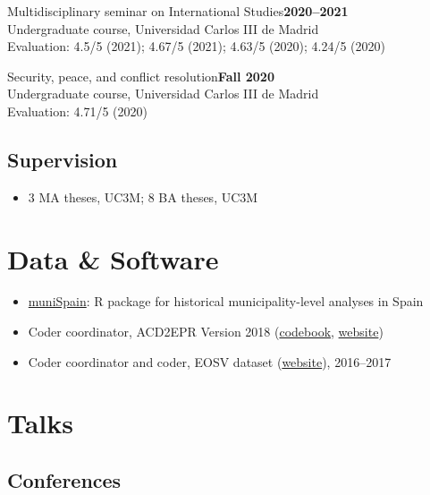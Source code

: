 \documentclass[a4paper, 12pt]{article}
\begin{document}
\noindent
Multidisciplinary seminar on International Studies\hfill\textbf{2020--2021}\\
{\small Undergraduate course, Universidad Carlos III de Madrid}\\
{\small Evaluation: 4.5/5 (2021); 4.67/5 (2021); 4.63/5 (2020); 4.24/5 (2020)}
\vspace{10pt}

\noindent
Security, peace, and conflict resolution\hfill\textbf{Fall 2020}\\
{\small Undergraduate course, Universidad Carlos III de Madrid}\\
{\small Evaluation: 4.71/5 (2020)}

\vspace{-10pt}
\subsection*{Supervision}

\begin{itemize}[leftmargin=*, nolistsep]
  \item 3 MA theses, UC3M; 8 BA theses, UC3M
\end{itemize}

\section*{Data \& Software}

\begin{itemize}[leftmargin=*, nolistsep]
  \item \href{https://github.com/franvillamil/muniSpain}{muniSpain}: R package for historical municipality-level analyses in Spain
	\item Coder coordinator, ACD2EPR Version 2018 (\href{https://icr.ethz.ch/data/epr/acd2epr/ACD2EPR-2018_Codebook.pdf}{codebook,} \href{https://icr.ethz.ch/data/epr/acd2epr/}{website})
	\item Coder coordinator and coder, EOSV dataset (\href{https://snis.ch/project/civilian-victimization-conflict-escalation/}{website}), 2016--2017
\end{itemize}

\section*{Talks}

\subsection*{Conferences}
\end{document}
